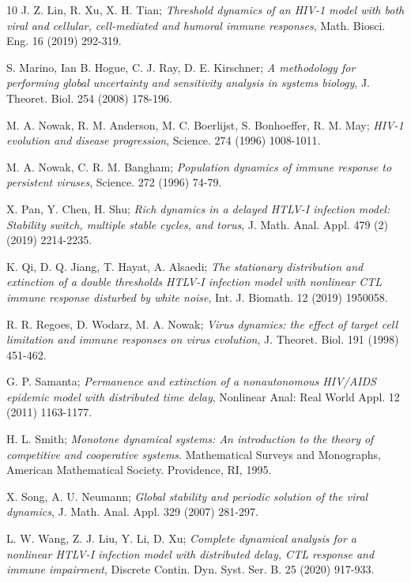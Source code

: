 \documentclass[reqno]{amsart}
\begin{document}
\begin{thebibliography}{10}
 J. Z. Lin, R. Xu, X. H. Tian;
\emph{Threshold dynamics of an HIV-1 model with both viral and cellular, 
cell-mediated and humoral immune responses}, 
Math. Biosci. Eng. 16 (2019) 292-319.

 S. Marino, Ian B. Hogue, C. J. Ray, D. E. Kirschner;
\emph{A methodology for performing global uncertainty and sensitivity analysis in 
systems biology},
J. Theoret. Biol. 254 (2008) 178-196.

 M. A. Nowak, R. M. Anderson, M. C. Boerlijst, S. Bonhoeffer, R. M. May;
\emph{HIV-1 evolution and disease progression}, Science. 274 (1996) 1008-1011.

 M. A. Nowak, C. R. M. Bangham;
\emph{Population dynamics of immune response to persistent viruses}, 
Science. 272 (1996) 74-79.
	
 X. Pan, Y. Chen, H. Shu;
\emph{Rich dynamics in a delayed HTLV-I infection model:
Stability switch, multiple stable cycles, and torus}, 
J. Math. Anal. Appl. 479 (2) (2019) 2214-2235.

 K. Qi, D. Q. Jiang, T. Hayat,  A. Alsaedi;
\emph{The stationary distribution and extinction of a double thresholds HTLV-I 
infection model with nonlinear CTL immune response disturbed by white noise}, 
Int. J. Biomath. 12 (2019) 1950058.

 R. R. Regoes, D. Wodarz, M. A. Nowak;
\emph{Virus dynamics: the effect of target cell limitation and immune responses 
on virus evolution},  J. Theoret. Biol. 191 (1998) 451-462.

 G. P. Samanta;
\emph{Permanence and extinction of a nonautonomous HIV/AIDS epidemic model with 
distributed time delay}, Nonlinear Anal: Real World Appl.
 12 (2011) 1163-1177.

 H. L. Smith;
\emph{Monotone dynamical systems: An introduction to the theory of competitive and 
cooperative systems}. Mathematical Surveys and Monographs,
 American Mathematical Society.  Providence, RI, 1995.

 X. Song, A. U. Neumann;
\emph{Global stability and periodic solution of the viral dynamics}, 
J. Math. Anal. Appl. 329 (2007) 281-297.

 L. W. Wang, Z. J. Liu,  Y. Li, D. Xu;
\emph{Complete dynamical analysis for a nonlinear HTLV-I infection model with 
distributed delay, CTL response and immune impairment}, 
Discrete Contin. Dyn. Syst. Ser. B. 25 (2020) 917-933.


\end{thebibliography}
\end{document}
